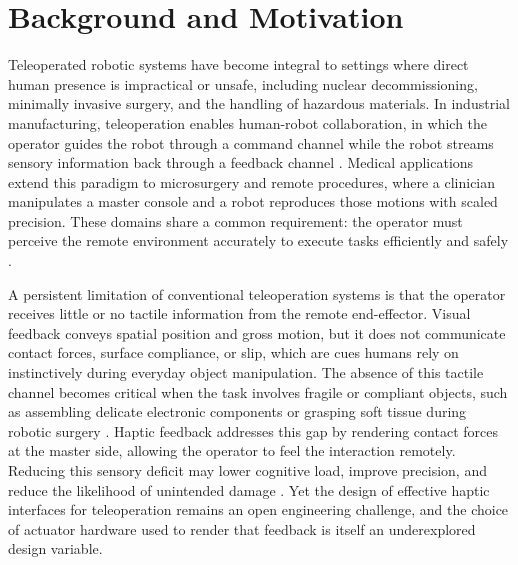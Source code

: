 \documentclass[12pt, a4paper]{report}
\begin{document}
\section{Background and Motivation}
Teleoperated robotic systems have become integral to settings where direct human presence is impractical or unsafe, including nuclear decommissioning, minimally invasive surgery, and the handling of hazardous materials. In industrial manufacturing, teleoperation enables human-robot collaboration, in which the operator guides the robot through a command channel while the robot streams sensory information back through a feedback channel \cite{zheng2024}. Medical applications extend this paradigm to microsurgery and remote procedures, where a clinician manipulates a master console and a robot reproduces those motions with scaled precision. These domains share a common requirement: the operator must perceive the remote environment accurately to execute tasks efficiently and safely \cite{huang2019}.

A persistent limitation of conventional teleoperation systems is that the operator receives little or no tactile information from the remote end-effector. Visual feedback conveys spatial position and gross motion, but it does not communicate contact forces, surface compliance, or slip, which are cues humans rely on instinctively during everyday object manipulation. The absence of this tactile channel becomes critical when the task involves fragile or compliant objects, such as assembling delicate electronic components or grasping soft tissue during robotic surgery \cite{zheng2024}. Haptic feedback addresses this gap by rendering contact forces at the master side, allowing the operator to feel the interaction remotely. Reducing this sensory deficit may lower cognitive load, improve precision, and reduce the likelihood of unintended damage \cite{zheng2024}. Yet the design of effective haptic interfaces for teleoperation remains an open engineering challenge, and the choice of actuator hardware used to render that feedback is itself an underexplored design variable.
\end{document}
